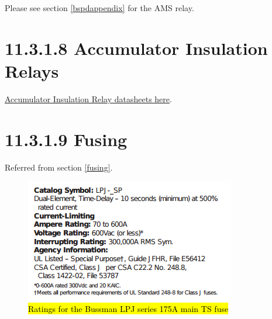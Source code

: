 \documentclass{article}
\DeclareRobustCommand{\hlr}[1]{{\sethlcolor{red}\hl{#1}}}
\begin{document}
Please see section \ref{bspdappendix} for the AMS relay. 

\section*{11.3.1.8 Accumulator Insulation Relays}

\href{http://www.rec-bms.com/datasheet/Technical_datasheet_Kilovac.pdf}{Accumulator Insulation Relay datasheets here}.

\section*{11.3.1.9 Fusing} \label{fusingappendix}

Referred from section \ref{fusing}.

\begin{figure}[H]
    \centering
    \includegraphics{TSmainratings}
    \caption{\hlr{Ratings for the Bussman LPJ series 175A main TS fuse}}
    \label{mainTSfuseratings}
\end{figure}
\end{document}
